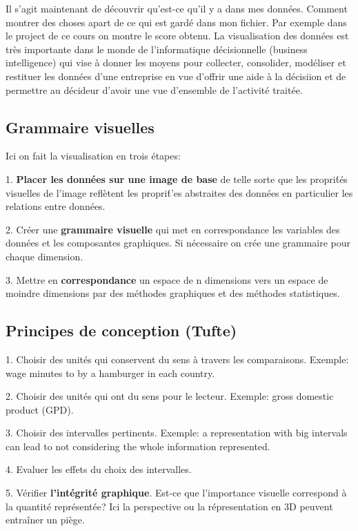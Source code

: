 Il s'agit maintenant de d\'ecouvrir qu'est-ce qu'il y a dans mes donn\'ees. Comment montrer des choses apart de ce qui est gard\'e dans mon fichier. Par exemple dans le project de ce cours on montre le score obtenu. La visualisation des donn\'ees est tr\`es importante dans le monde de l'informatique d\'ecisionnelle (business intelligence) qui vise \`a donner les moyens pour collecter, consolider, mod\'eliser et restituer les donn\'ees d'une entreprise en vue d'offrir une aide \`a la d\'ecisiion et de permettre au d\'ecideur d'avoir une vue d'ensemble de l'activit\'e trait\'ee.

\subsection{Grammaire visuelles}

Ici on fait la visualisation en trois \'etapes:

1. \textbf{Placer les donn\'ees sur une image de base} de telle sorte que les propri\'t\'es visuelles de l'image refl\`etent les propri\'t'es abstraites des donn\'ees en particulier les relations entre donn\'ees. 

2. Cr\'eer une \textbf{grammaire visuelle} qui met en correspondance les variables des donn\'ees et les composantes graphiques. Si n\'ecessaire on cr\'ee une grammaire pour chaque dimension.

3. Mettre en \textbf{correspondance} un espace de n dimensions vers un espace de moindre dimensions par des m\'ethodes graphiques et des m\'ethodes statistiques.

\subsection{Principes de conception (Tufte)}

1. Choisir des unit\'es qui conservent du sens \`a travers les comparaisons. Exemple: wage minutes to by a hamburger in each country.

2. Choisir des unit\'es qui ont du sens pour le lecteur. Exemple: gross domestic product (GPD).

3. Choisir des intervalles pertinents. Exemple: a representation with big intervals can lead to not considering the whole information represented.

4. Evaluer les effets du choix des intervalles.

5. V\'erifier \textbf{l'int\'egrit\'e graphique}. Est-ce que l'importance visuelle correspond \`a la quantit\'e repr\'esent\'ee? Ici la perspective ou la r\'epresentation en 3D peuvent entra\^iner un pi\`ege.

